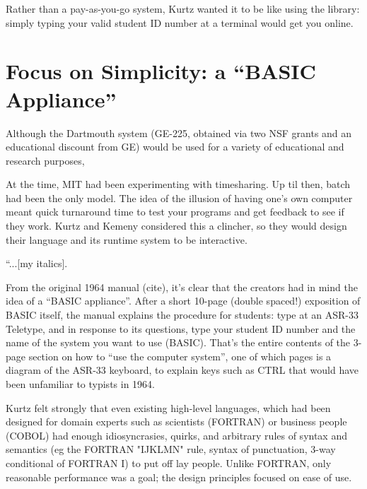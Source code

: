\documentclass{article}
\begin{document}
Rather than a
pay-as-you-go system, Kurtz wanted it to be like using the library:
simply typing your valid student ID number at a terminal would get you
online.


\section{Focus on Simplicity: a ``BASIC Appliance''}




Although the Dartmouth system (GE-225, obtained via two NSF grants and
an educational discount from GE) would be used for a variety of
educational and research purposes, 

At the time, MIT had been experimenting with timesharing.
 Up til then,
batch had been the only model.  The idea of the illusion of having one's
own computer meant quick turnaround time to test your programs and get
feedback to see if they work.  Kurtz and Kemeny considered this a
clincher, so they would design their language and its runtime system to
be interactive.

``...[my italics].

From the original 1964 manual (cite), it's clear that the creators had
in mind the idea of a ``BASIC appliance''.  After a short 10-page
(double spaced!) exposition of BASIC itself, the manual
explains the procedure for students: type  at an ASR-33
Teletype, and in response to its questions, type your student ID number
and the name of the system you want to use (BASIC).  That's the entire
contents of the  3-page section on how to ``use the computer system'',
one of which pages is a diagram of the ASR-33 keyboard,
to explain keys such as CTRL that would have been unfamiliar to
typists in 1964.


Kurtz felt strongly that even existing high-level
languages, which had been designed for domain experts such as scientists
(FORTRAN) or business people (COBOL) 
had enough idiosyncrasies, quirks, and arbitrary rules of syntax and
semantics (eg the FORTRAN "IJKLMN" rule, syntax of punctuation, 3-way
conditional of FORTRAN I) to put off lay people.  Unlike FORTRAN,
only reasonable performance was a goal; the design principles focused on
ease of use.
\end{document}
